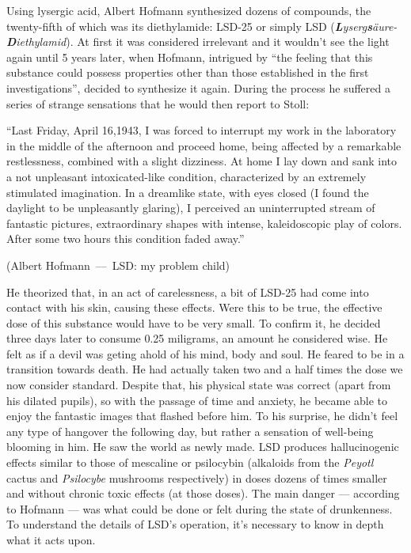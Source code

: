 Using lysergic acid, Albert Hofmann synthesized dozens of compounds, the twenty-fifth of which was its diethylamide: LSD-25 or simply LSD (\textit{\textbf{L}yserg\textbf{s}äure-\textbf{D}iethylamid}). At first it was considered irrelevant and it wouldn't see the light again until 5 years later, when Hofmann, intrigued by \enquote{the feeling that this substance could possess properties other than those established in the first investigations}, decided to synthesize it again. During the process he suffered a series of strange sensations that he would then report to Stoll:

\let\oldquote\quote
\let\endoldquote\endquote
\renewenvironment{quote}[2][]
  {\if\relax\detokenize{#1}\relax
     \def\quoteauthor{#2}%
   \else
     \def\quoteauthor{#2~---~#1}%
   \fi
   \oldquote}
  {\par\nobreak\smallskip\hfill(\quoteauthor)%
   \endoldquote\addvspace{\bigskipamount}}

\begin{quote}[LSD: my problem child]{Albert Hofmann}
	\enquote{Last Friday, April 16,1943, I was forced to interrupt my work in the laboratory in the middle of the afternoon and proceed home, being affected by a remarkable restlessness, combined with a slight dizziness. At home I lay down and sank into a not unpleasant intoxicated-like condition, characterized by an extremely stimulated imagination. In a dreamlike state, with eyes closed (I found the daylight to be unpleasantly glaring), I perceived an uninterrupted stream of fantastic pictures, extraordinary shapes with intense, kaleidoscopic play of colors. After some two hours this condition faded away.}
\end{quote}

He theorized that, in an act of carelessness, a bit of LSD-25 had come into contact with his skin, causing these effects. Were this to be true, the effective dose of this substance would have to be very small. To confirm it, he decided three days later to consume 0.25 miligrams, an amount he considered wise. He felt as if a devil was geting ahold of his mind, body and soul. He feared to be in a transition towards death. He had actually taken two and a half times the dose we now consider standard. Despite that, his physical state was correct (apart from his dilated pupils), so with the passage of time and anxiety, he became able to enjoy the fantastic images that flashed before him. To his surprise, he didn't feel any type of hangover the following day, but rather a sensation of well-being blooming in him. He saw the world as newly made. LSD produces hallucinogenic effects similar to those of mescaline or psilocybin (alkaloids from the \textit{Peyotl} cactus and \textit{Psilocybe} mushrooms respectively) in doses dozens of times smaller and without chronic toxic effects (at those doses). The main danger --- according to Hofmann --- was what could be done or felt during the state of drunkenness. To understand the details of LSD's operation, it's necessary to know in depth what it acts upon.

\newpage
